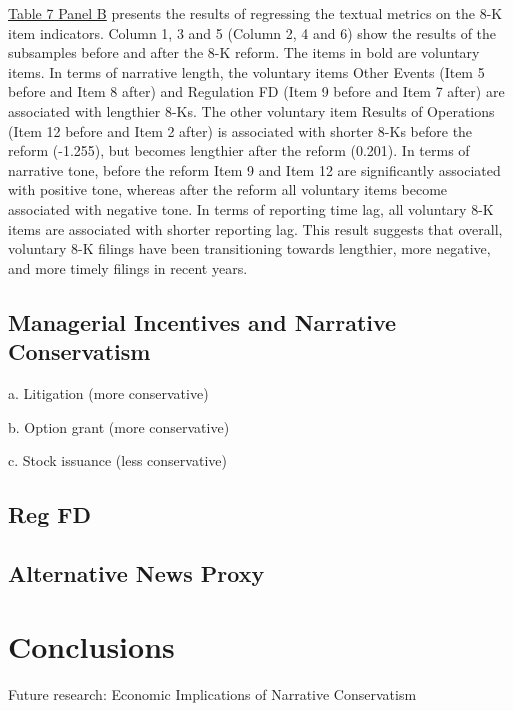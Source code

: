 \documentclass[a4paper]{article}
\begin{document}
\begin{spacing}{2}
\hyperref[T7PB]{Table 7 Panel B} presents the results of regressing the textual metrics on the 8-K item indicators. Column 1, 3 and 5 (Column 2, 4 and 6) show the results of the subsamples before and after the 8-K reform. The items in bold are voluntary items. In terms of narrative length, the voluntary items Other Events (Item 5 before and Item 8 after) and Regulation FD (Item 9 before and Item 7 after) are associated with lengthier 8-Ks. The other voluntary item Results of Operations (Item 12 before and Item 2 after) is associated with shorter 8-Ks before the reform (-1.255), but becomes lengthier after the reform (0.201). In terms of narrative tone, before the reform Item 9 and Item 12 are significantly associated with positive tone, whereas after the reform all voluntary items become associated with negative tone. In terms of reporting time lag, all voluntary 8-K items are associated with shorter reporting lag. This result suggests that overall, voluntary 8-K filings have been transitioning towards lengthier, more negative, and more timely filings in recent years.

\subsection{Managerial Incentives and Narrative Conservatism}
a.	Litigation (more conservative)

b.	Option grant (more conservative)

c.	Stock issuance (less conservative)

\subsection{Reg FD}

\subsection{Alternative News Proxy}

\section{Conclusions}

Future research: Economic Implications of Narrative Conservatism

\end{spacing}

\newpage



\newpage


\newpage


\newpage


\newpage
\setcounter{page}{1}

\end{document}
